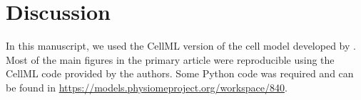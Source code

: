\documentclass[fleqn,10pt]{physiome}
\begin{document}
\section{Discussion}

In this manuscript, we used the CellML version of the cell model developed by \citet{afshar2021computational}. Most of the main figures in the primary article were reproducible using the CellML code provided by the authors. Some Python code was required and can be found in \url{https://models.physiomeproject.org/workspace/840}.\newline


\end{document}
